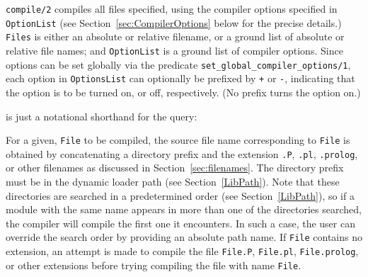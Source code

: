 \begin{description}
%
{\tt compile/2} compiles all files specified, using the compiler
options specified in {\tt OptionList} (see
Section~\ref{sec:CompilerOptions} below for the precise details.)
{\tt Files} is either an absolute or relative filename, or a ground
list of absolute or relative file names; and {\tt OptionList} is a
ground list of compiler options.  Since options can be set globally
via the predicate {\tt set\_global\_compiler\_options/1}, each option
in {\tt OptionsList} can optionally be prefixed by \verb|+| or
\verb|-|, indicating that the option is to be turned on, or off,
respectively.  (No prefix turns the option on.)


\noindent
is just a notational shorthand for the query:



For a given, {\tt File} to be compiled, the source file name
corresponding to {\tt File} is obtained by concatenating a directory
prefix and the extension {\tt .P}, {\tt .pl}, {\tt .prolog}, or other filenames as
discussed in Section~\ref{sec:filenames}.  The directory prefix must
be in the dynamic loader path (see Section~\ref{LibPath}).  Note that
these directories are searched in a predetermined order (see
Section~\ref{LibPath}), so if a module with the same name appears in
more than one of the directories searched, the compiler will compile
the first one it encounters.  In such a case, the user can override
the search order by providing an absolute path name.
%
If {\tt File} contains no extension, an attempt is made to compile the
file {\tt File.P}, {\tt File.pl}, {\tt File.prolog}, or other extensions 
before trying compiling the file with name {\tt File}.


\end{description}
